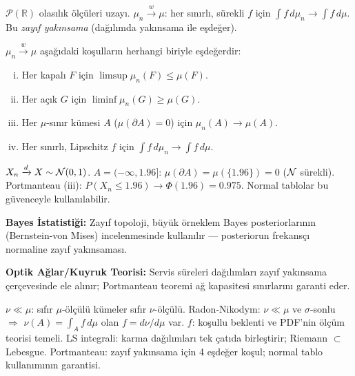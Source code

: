 \begin{tanim}\label{def:zayif_yakin}
$\mathcal{P}(\mathbb{R})$ olasılık ölçüleri uzayı. $\mu_n\overset{w}{\to}\mu$: her sınırlı, sürekli $f$ için $\int f\,d\mu_n\to\int f\,d\mu$. Bu \emph{zayıf yakınsama} (dağılımda yakınsama ile eşdeğer).
\end{tanim}

\begin{teorem}\label{thm:portmanteau}
$\mu_n\overset{w}{\to}\mu$ aşağıdaki koşulların herhangi biriyle eşdeğerdir:
\begin{enumerate}[(i)]
  \item Her kapalı $F$ için $\limsup\mu_n(F)\leq\mu(F)$.
  \item Her açık $G$ için $\liminf\mu_n(G)\geq\mu(G)$.
  \item Her $\mu$-sınır kümesi $A$ ($\mu(\partial A)=0$) için $\mu_n(A)\to\mu(A)$.
  \item Her sınırlı, Lipschitz $f$ için $\int f\,d\mu_n\to\int f\,d\mu$.
\end{enumerate}
\end{teorem}

\begin{ornek}\label{ex:portmanteau_uygulama}
$X_n\xrightarrow{d} X\sim\mathcal{N}(0,1)$. $A=(-\infty,1.96]$: $\mu(\partial A)=\mu(\{1.96\})=0$ ($\mathcal{N}$ sürekli). Portmanteau (iii): $P(X_n\leq1.96)\to\Phi(1.96)=0.975$. Normal tablolar bu güvenceyle kullanılabilir.
\end{ornek}

\begin{disiplinlerarasibaglan}
\textbf{Bayes İstatistiği:} Zayıf topoloji, büyük örneklem Bayes posteriorlarının (Bernstein-von Mises) incelenmesinde kullanılır --- posteriorun frekansçı normaline zayıf yakınsaması.

\textbf{Optik Ağlar/Kuyruk Teorisi:} Servis süreleri dağılımları zayıf yakınsama çerçevesinde ele alınır; Portmanteau teoremi ağ kapasitesi sınırlarını garanti eder.
\end{disiplinlerarasibaglan}

\begin{mikroozet}
$\nu \ll \mu$: sıfır $\mu$-ölçülü kümeler sıfır $\nu$-ölçülü.
Radon-Nikodym: $\nu \ll \mu$ ve $\sigma$-sonlu $\Rightarrow$ $\nu(A) = \int_A f\,d\mu$ olan $f = d\nu/d\mu$ var.
$f$: koşullu beklenti ve PDF'nin ölçüm teorisi temeli.
LS integrali: karma dağılımları tek çatıda birleştirir; Riemann $\subset$ Lebesgue.
Portmanteau: zayıf yakınsama için 4 eşdeğer koşul; normal tablo kullanımının garantisi.
\end{mikroozet}

